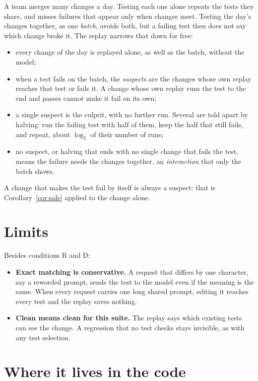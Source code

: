 \documentclass[11pt,a4paper]{article}
\begin{document}
A team merges many changes a day. Testing each one alone repeats the tests they share, and misses failures that
appear only when changes meet. Testing the day's changes together, as one \emph{batch}, avoids both, but a failing
test then does not say which change broke it. The replay narrows that down for free:
\begin{itemize}
  \item every change of the day is replayed alone, as well as the batch, without the model;
  \item when a test fails on the batch, the \emph{suspects} are the changes whose own replay reaches that test or
        fails it. A change whose own replay runs the test to the end and passes cannot make it fail on its own;
  \item a single suspect is the culprit, with no further run. Several are told apart by halving: run the failing
        test with half of them, keep the half that still fails, and repeat, about $\log_2$ of their number of runs;
  \item no suspect, or halving that ends with no single change that fails the test, means the failure needs the
        changes together, an \emph{interaction} that only the batch shows.
\end{itemize}
A change that makes the test fail by itself is always a suspect: that is Corollary~\ref{cor:safe} applied to the
change alone.

\section{Limits}

Besides conditions R and D:
\begin{itemize}
  \item \textbf{Exact matching is conservative.} A request that differs by one character, say a reworded prompt,
        sends the test to the model even if the meaning is the same. When every request carries one long shared
        prompt, editing it reaches every test and the replay saves nothing.
  \item \textbf{Clean means clean for this suite.} The replay says which existing tests can see the change. A
        regression that no test checks stays invisible, as with any test selection.
\end{itemize}

\section{Where it lives in the code}
\end{document}
